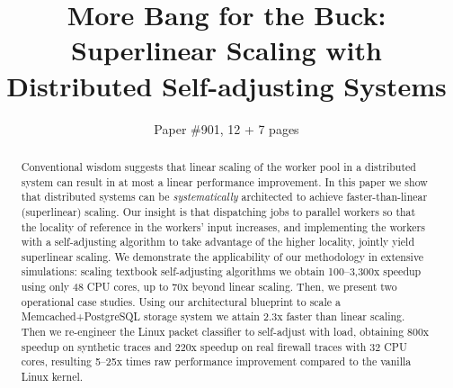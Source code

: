 \documentclass[sigconf,10pt]{acmart}
\begin{document}


\title{More Bang for the Buck: Superlinear Scaling with Distributed Self-adjusting Systems}

\author{Paper \#901, 12 + 7 pages}

\begin{abstract}
  Conventional wisdom suggests that linear scaling of the worker pool in a distributed system can result in at most a linear performance improvement.  In this paper we show that distributed systems can be \emph{systematically} architected to achieve faster-than-linear (superlinear) scaling. Our insight is that dispatching jobs to parallel workers so that the locality of reference in the workers' input increases, and implementing the workers with a self-adjusting algorithm to take advantage of the higher locality, jointly yield superlinear scaling. We demonstrate the applicability of our methodology in extensive simulations: scaling textbook self-adjusting algorithms we obtain 100--3,300x speedup using only 48 CPU cores, up to 70x beyond linear scaling. Then, we present two operational case studies. Using our architectural blueprint to scale a Memcached+PostgreSQL storage system we attain 2.3x faster than linear scaling. Then we re-engineer the Linux packet classifier to self-adjust with load, obtaining 800x speedup on synthetic traces and 220x speedup on real firewall traces with 32 CPU cores, resulting 5--25x times raw performance improvement compared to the vanilla Linux kernel.
\end{abstract}

\maketitle















 
\begin{small}

\end{small}


\begin{appendices}



\end{appendices}
\end{document}
